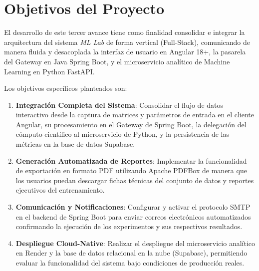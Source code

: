 \section{Objetivos del Proyecto}\label{sec:objetivo}

El desarrollo de este tercer avance tiene como finalidad consolidar e integrar la arquitectura del sistema \textit{ML Lab} de forma vertical (Full-Stack), comunicando de manera fluida y desacoplada la interfaz de usuario en Angular 18+, la pasarela del Gateway en Java Spring Boot, y el microservicio analítico de Machine Learning en Python FastAPI.

Los objetivos específicos planteados son:

\begin{enumerate}
    \item \textbf{Integración Completa del Sistema}: Consolidar el flujo de datos interactivo desde la captura de matrices y parámetros de entrada en el cliente Angular, su procesamiento en el Gateway de Spring Boot, la delegación del cómputo científico al microservicio de Python, y la persistencia de las métricas en la base de datos Supabase.
    \item \textbf{Generación Automatizada de Reportes}: Implementar la funcionalidad de exportación en formato PDF utilizando Apache PDFBox de manera que los usuarios puedan descargar fichas técnicas del conjunto de datos y reportes ejecutivos del entrenamiento.
    \item \textbf{Comunicación y Notificaciones}: Configurar y activar el protocolo SMTP en el backend de Spring Boot para enviar correos electrónicos automatizados confirmando la ejecución de los experimentos y sus respectivos resultados.
    \item \textbf{Despliegue Cloud-Native}: Realizar el despliegue del microservicio analítico en Render y la base de datos relacional en la nube (Supabase), permitiendo evaluar la funcionalidad del sistema bajo condiciones de producción reales.
\end{enumerate}
